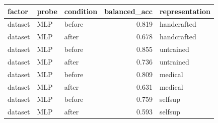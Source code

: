 \begin{tabular}{lllrl}
\toprule
factor & probe & condition & balanced\_acc & representation \\
\midrule
dataset & MLP & before & 0.819 & handcrafted \\
dataset & MLP & after & 0.678 & handcrafted \\
dataset & MLP & before & 0.855 & untrained \\
dataset & MLP & after & 0.736 & untrained \\
dataset & MLP & before & 0.809 & medical \\
dataset & MLP & after & 0.631 & medical \\
dataset & MLP & before & 0.759 & selfsup \\
dataset & MLP & after & 0.593 & selfsup \\
\bottomrule
\end{tabular}
